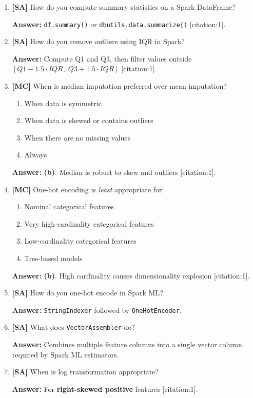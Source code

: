 \documentclass[11pt]{article}
\begin{document}
	\begin{enumerate}[leftmargin=*, label=\textbf{Q\arabic*.}, start=16]
		
		\item \textbf{[SA]} How do you compute summary statistics on a Spark DataFrame?
		
		\textbf{Answer:} \texttt{df.summary()} or \texttt{dbutils.data.summarize()} [citation:1].
		
		\item \textbf{[SA]} How do you remove outliers using IQR in Spark?
		
		\textbf{Answer:} Compute Q1 and Q3, then filter values outside $[Q1 - 1.5 \cdot IQR,\; Q3 + 1.5 \cdot IQR]$ [citation:1].
		
		\item \textbf{[MC]} When is median imputation preferred over mean imputation?
		\begin{enumerate}[label=(\alph*)]
			\item When data is symmetric
			\item When data is skewed or contains outliers
			\item When there are no missing values
			\item Always
		\end{enumerate}
		
		\textbf{Answer:} \textbf{(b)}. Median is robust to skew and outliers [citation:1].
		
		\item \textbf{[MC]} One-hot encoding is \emph{least} appropriate for:
		\begin{enumerate}[label=(\alph*)]
			\item Nominal categorical features
			\item Very high-cardinality categorical features
			\item Low-cardinality categorical features
			\item Tree-based models
		\end{enumerate}
		
		\textbf{Answer:} \textbf{(b)}. High cardinality causes dimensionality explosion [citation:1].
		
		\item \textbf{[SA]} How do you one-hot encode in Spark ML?
		
		\textbf{Answer:} \texttt{StringIndexer} followed by \texttt{OneHotEncoder}.
		
		\item \textbf{[SA]} What does \texttt{VectorAssembler} do?
		
		\textbf{Answer:} Combines multiple feature columns into a single vector column required by Spark ML estimators.
		
		\item \textbf{[SA]} When is log transformation appropriate?
		
		\textbf{Answer:} For \textbf{right-skewed positive} features [citation:1].
		
	\end{enumerate}
	
\end{document}
